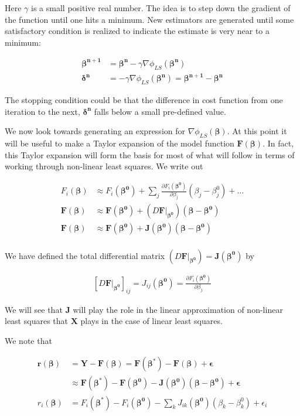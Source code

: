 \documentclass[12pt]{article}
\newcommand{\ep}{\epsilon}
\newcommand{\bv}[1]{\boldsymbol{#1}}
\begin{document}
Here $\gamma$ is a small positive real number. The idea is to step down the gradient of the function until one hits a minimum. New estimators are generated until some satisfactory condition is realized to indicate the estimate is very near to a minimum:

\begin{align}
\bv{\beta^{n+1}} &= \bv{\beta^n} - \gamma \nabla \phi_{LS}(\bv{\beta^n})\\
\bv{\delta^n} &= -\gamma\nabla \phi_{LS}(\bv{\beta^n}) = \bv{\beta^{n+1}} - \bv{\beta^n}
\end{align}

The stopping condition could be that the difference in cost function from one iteration to the next, $\bv{\delta^n}$ falls below a small pre-defined value.

We now look towards generating an expression for $\nabla \phi_{LS}(\bv{\beta})$.
At this point it will be useful to make a Taylor expansion of the model function $\bv{F}(\bv{\beta})$.
In fact, this Taylor expansion will form the basis for most of what will follow in terms of working through non-linear least squares. 
We write out

\begin{align}
F_i(\bv{\beta}) &\approx F_i(\bv{\beta^0}) + \sum_j \frac{\partial F_i(\bv{\beta^0})}{\partial \beta_j} (\beta_j-\beta_j^0) + \ldots\\
\bv{F}(\bv{\beta}) &\approx \bv{F}(\bv{\beta^0}) + (D\bv{F}\rvert_{\bv{\beta^0}})(\bv{\beta}-\bv{\beta^0})\\
\bv{F}(\bv{\beta}) &\approx \bv{F}(\bv{\beta^0}) + \bv{J}(\bv{\beta^0})(\bv{\beta}-\bv{\beta^0})\\
\end{align}

We have defined the total differential matrix $(D\bv{F}\rvert_{\bv{\beta^0}}) = \bv{J}(\bv{\beta^0})$ by

\begin{align}
\left[D\bv{F}\rvert_{\bv{\beta^0}}\right]_{ij} = J_{ij}(\bv{\beta^0}) = \frac{\partial F_i(\bv{\beta^0})}{\partial{\beta_j}}
\end{align}

We will see that $\bv{J}$ will play the role in the linear approximation of non-linear least squares that $\bv{X}$ plays in the case of linear least squares.

We note that

\begin{align}
\bv{r}(\bv{\beta}) &= \bv{Y} - \bv{F}(\bv{\beta}) = \bv{F}(\bv{\beta^*}) - \bv{F}(\bv{\beta}) + \bv{\ep}\\
&\approx \bv{F}(\bv{\beta^*}) - \bv{F}(\bv{\beta^0}) - \bv{J}(\bv{\beta^0})(\bv{\beta}-\bv{\beta^0}) + \bv{\ep}\\
r_i(\bv{\beta}) &= F_i(\bv{\beta^*}) - F_i(\bv{\beta^0}) - \sum_k J_{ik}(\bv{\beta^0})(\beta_k - \beta_k^0) + \ep_i
\end{align}
\end{document}
